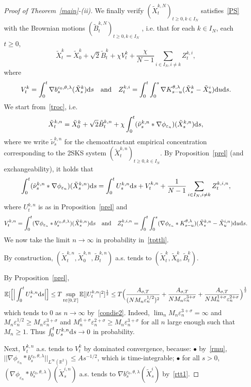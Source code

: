 \documentclass[11pt]{article}
\newcommand{\E}{\mathbb{E}}
\newcommand{\R}{\mathbb{R}}
\newcommand{\1}{\mathbbm{1}}
\newcommand{\tX}{\tilde X}
\newcommand{\tB}{\tilde B}
\newcommand{\dd}{{\rm d}}
\newcommand{\e}{\varepsilon}
\newcommand{\vip}{\vskip5pt}
\begin{document}
\begin{proof}[Proof of Theorem~\ref{main}-(ii)]
\vip

We finally verify $(\tX^{k,N}_t)_{t\geq 0,k\in I_N}$  satisfies~\eqref{PS} with the Brownian motions $(\tB^{k,N}_t)_{t\geq 0,k\in I_N}$ , i.e. that for each $k\in I_N$, each $t\geq 0$,
$$
\tX^{k}_t=\tX^{k}_0 + \sqrt 2 \tB^{k}_t + \chi V^{k}_t+ \frac \chi {N-1} \sum_{i \in I_N,i\neq k} Z^{k,i}_t,
$$
where
$$
V^{k}_t=\int_0^t \nabla b^{c_0,\theta,\lambda}_s(\tX^{k}_s)\dd s
\quad \hbox{and}\quad Z^{k,i}_t=
\int_0^t \int_0^s \nabla K_{s-u}^{\theta,\lambda}(\tX^{k}_s-\tX^{i}_u) \dd u \dd s.
$$
We start from~\eqref{troc}, i.e.
\begin{equation}\label{tpttli}
\tX^{k,n}_t=\tX^{k}_0 + \sqrt 2 \tB^{k,n}_t 
+ \chi \int_0^t (\tilde \nu^{k,n}_s \ast \nabla \phi_{\e_{n}})(\tX^{k,n}_s)\dd s,
\end{equation}
where we write $\tilde \nu^{k,n}_s$ for the chemoattractant empirical concentration corresponding to the 
2SKS system $(\tX^{k,n}_t)_{t\geq 0, k \in I_N}$. By Proposition~\ref{prel} (and exchangeability),
it holds that
$$
\int_0^t(\tilde \nu^{k,n}_s \ast \nabla \phi_{\e_{n}})(\tX^{k,n}_s)\dd s= \int_0^t U^{k,n}_s \dd s+V^{k,n}_t+
\frac1{N-1} \sum_{i \in I_N,i\neq k} Z^{k,i,n}_t,
$$
where $U^{k,n}_t$ is as in Proposition~\ref{prel} and
$$
V^{k,n}_t=\int_0^t(\nabla \phi_{\e_{n}}\ast b^{c_0,\theta,\lambda}_s)(\tX^{k,n}_s)\dd s
\quad \text{and}\quad  Z^{k,i,n}_t=\int_0^t \int_0^s(\nabla \phi_{\e_{n}}\ast K^{\theta,\lambda}_{s-u})(\tX^{k,n}_s
-\tX^{i,n}_u)\dd u \dd s.
$$
We now take the limit $n\to \infty$ in probability in~\eqref{tpttli}.

\vip
By construction, 
$(\tX^{k,n}_t,\tX^{k,n}_0,\tB^{k,n}_t)$ a.s. tends to $(\tX^{k}_t,\tX^{k}_0,\tB^k_t)$.

\vip
By Proposition~\ref{prel}, 
$$
\E[\Big[\Big|\int_0^t U^{k,n}_s \dd s\Big|\Big] \leq T\sup_{t\in [0,T]}\E[|U^{k,n}_t|^2]^{\frac12}
\leq T\Big(\frac{A_{\sigma,T}}{(NM_n \e_n^{1/2})^{2}}
+\frac{A_{\sigma,T}}{NM_n \e_n^{3+\sigma}}+\frac{A_{\sigma,T}}{NM_n^{1+\sigma}\e_n^{2+\sigma}}\Big)^{\frac12}
$$
which tends to $0$ as $n\to \infty$ by~\eqref{condie2}. Indeed, $\lim_{n}M_n \e_n^{3+\sigma}=\infty$
and $M_n \e_n^{1/2}\geq M_n\e_n^{3+\sigma}$ and $M_n^{1+\sigma}\e_n^{2+\sigma}\geq M_n\e_n^{3+\sigma}$ for all
$n$ large enough such that $M_n\geq 1$. Thus $\int_0^t U^{k,n}_s \dd s\to 0$ in probability.

\vip

Next, $V^{k,n}_t$ a.s. tends to $V^{k}_t$ by dominated convergence, because:
\vip
\noindent $\bullet$ by~\eqref{rmu}, $||\nabla \phi_{\e_n}\ast b^{c_0,\theta,\lambda}_s||_{L^\infty(\R^2)}\leq A s^{-1/2}$, 
which is time-integrable;
\vip
\noindent $\bullet$ for all $s>0$,  $(\nabla \phi_{\e_{n}}\ast b^{c_0,\theta,\lambda}_{s})(\tX^{i,n}_s)$ a.s. tends to 
$\nabla b^{c_0,\theta,\lambda}_{s}(\tX^{i}_s)$ by~\eqref{rtt1}.


\end{proof}
\end{document}
